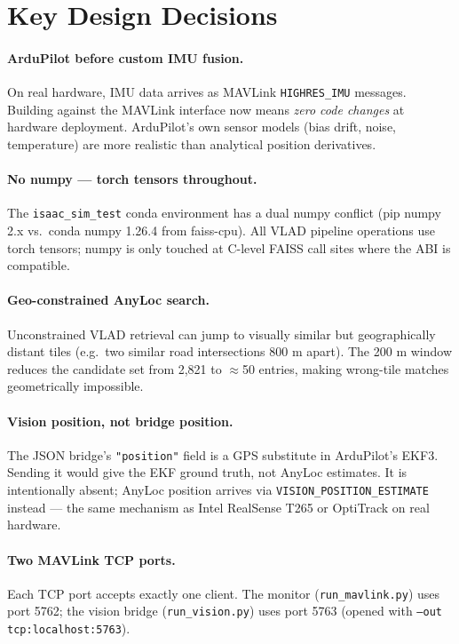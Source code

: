 \documentclass[11pt,a4paper]{article}
\begin{document}
\section{Key Design Decisions}
\label{sec:decisions}

\paragraph{ArduPilot before custom IMU fusion.}
On real hardware, IMU data arrives as MAVLink \texttt{HIGHRES\_IMU} messages.  Building against
the MAVLink interface now means \textit{zero code changes} at hardware deployment.
ArduPilot's own sensor models (bias drift, noise, temperature) are more realistic than
analytical position derivatives.

\paragraph{No numpy --- torch tensors throughout.}
The \texttt{isaac\_sim\_test} conda environment has a dual numpy conflict
(pip numpy 2.x vs.\ conda numpy 1.26.4 from faiss-cpu).  All VLAD pipeline operations use
torch tensors; numpy is only touched at C-level FAISS call sites where the ABI is compatible.

\paragraph{Geo-constrained AnyLoc search.}
Unconstrained VLAD retrieval can jump to visually similar but geographically distant tiles
(e.g.\ two similar road intersections 800 m apart).  The 200 m window reduces the candidate
set from 2,821 to $\approx$50 entries, making wrong-tile matches geometrically impossible.

\paragraph{Vision position, not bridge position.}
The JSON bridge's \texttt{"position"} field is a GPS substitute in ArduPilot's EKF3.
Sending it would give the EKF ground truth, not AnyLoc estimates.  It is intentionally
absent; AnyLoc position arrives via \texttt{VISION\_POSITION\_ESTIMATE} instead
--- the same mechanism as Intel RealSense T265 or OptiTrack on real hardware.

\paragraph{Two MAVLink TCP ports.}
Each TCP port accepts exactly one client.  The monitor (\texttt{run\_mavlink.py}) uses port 5762;
the vision bridge (\texttt{run\_vision.py}) uses port 5763 (opened with \texttt{--out tcp:localhost:5763}).
\end{document}
